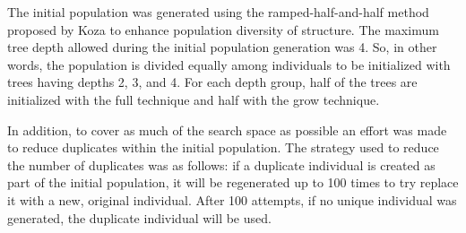 The initial population was generated using the ramped-half-and-half method proposed by Koza \cite{koza1992genetic} to enhance population diversity of structure. The maximum tree depth allowed during the initial population generation was 4. So, in other words, the population is divided equally among individuals to be initialized with trees having depths 2, 3, and 4. For each depth group, half of the trees are initialized with the full technique and half with the grow technique.

In addition, to cover as much of the search space as possible an effort was made to reduce duplicates within the initial population. The strategy used to reduce the number of duplicates was as follows: if a duplicate individual is created as part of the initial population, it will be regenerated up to 100 times to try replace it with a new, original individual. After 100 attempts, if no unique individual was generated, the duplicate individual will be used.